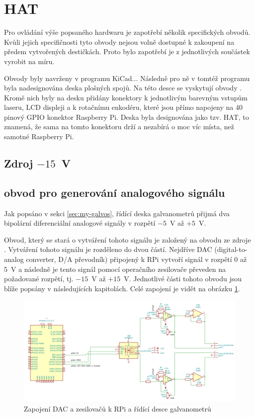 \section{HAT}
Pro ovládání výše popsaného hardwaru je zapotřebí několik specifických obvodů.
Kvůli jejich specifičnosti tyto obvody nejsou volně dostupné k zakoupení na předem vytvořených destičkách. Proto bylo zapotřebí je z jednotlivých součástek vyrobit na míru.

Obvody byly navrženy v programu KiCad...
Následně pro ně v tomtéž programu byla nadesignována deska plošných spojů. Na této desce se vyskytují obvody .
Kromě nich byly na desku přidány konektory k jednotlivým barevným vstupům laseru, LCD displeji a k rotačnímu enkodéru, které jsou přímo napojeny na 40 pinový GPIO konektor Raspberry Pi.
Deska byla designována jako tzv. HAT, to znamená, že sama na tomto konektoru drží a nezabírá o moc víc místa, než samotné Raspberry Pi.

\subsection{Zdroj $-15$~V}

\subsection{obvod pro generování analogového signálu}
Jak popsáno v sekci \ref{sec:my-galvos}, řídící deska galvanometrů přijmá dva bipolární diferenciální analogové signály v rozpětí $-5$~V až $+5$~V.

Obvod, který se stará o vytváření tohoto signálu je založený na obvodu ze zdroje \cite{lasershow-with-real-galvos}.
Vytváření tohoto signálu je rozděleno do dvou částí. Nejdříve DAC (digital-to-analog converter, D/A převodník) připojený k RPi vytvoří signál v rozpětí 0 až 5~V a následně je tento signál pomocí operačního zesilovače převeden na požadované rozpětí, tj. $-15$~V až $+15$~V.
Jednotlivé části tohoto obvodu jsou blíže popsány v následujících kapitolách. Celé zapojení je vidět na obrázku \ref{fig:dac_board}.
\begin{figure}[!htb]
  \centering
  \includegraphics[width=1\textwidth]{img/dac_board.png} 
  \caption{\label{fig:dac_board}Zapojení DAC a zesilovačů k RPi a řídící desce galvanometrů}
\end{figure}

